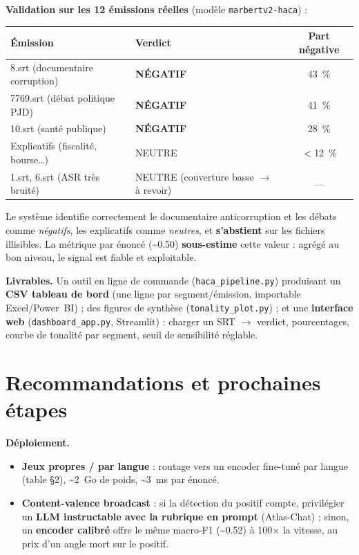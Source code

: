 \documentclass[11pt, a4paper]{article}
\begin{document}
\textbf{Validation sur les 12 émissions réelles} (modèle \texttt{marbertv2-haca}) :

\begin{center}
\small
\begin{tabular}{llc}
\toprule
\textbf{Émission} & \textbf{Verdict} & \textbf{Part négative} \\
\midrule
8.srt (documentaire corruption)  & \textcolor{warnred}{\textbf{NÉGATIF}} & 43~\% \\
7769.srt (débat politique PJD)    & \textcolor{warnred}{\textbf{NÉGATIF}} & 41~\% \\
10.srt (santé publique)           & \textcolor{warnred}{\textbf{NÉGATIF}} & 28~\% \\
Explicatifs (fiscalité, bourse…)  & NEUTRE & $<$12~\% \\
1.srt, 6.srt (ASR très bruité)    & NEUTRE (couverture basse $\rightarrow$ à revoir) & --- \\
\bottomrule
\end{tabular}
\end{center}

Le système identifie correctement le documentaire anticorruption et les débats comme
\emph{négatifs}, les explicatifs comme \emph{neutres}, et \textbf{s'abstient} sur les
fichiers illisibles. La métrique par énoncé (\textasciitilde0.50) \textbf{sous-estime} cette
valeur : agrégé au bon niveau, le signal est fiable et exploitable.

\textbf{Livrables.} Un outil en ligne de commande (\texttt{haca\_pipeline.py}) produisant un
\textbf{CSV tableau de bord} (une ligne par segment/émission, importable Excel/Power~BI) ;
des figures de synthèse (\texttt{tonality\_plot.py}) ; et une \textbf{interface web}
(\texttt{dashboard\_app.py}, Streamlit) : charger un SRT $\rightarrow$ verdict, pourcentages,
courbe de tonalité par segment, seuil de sensibilité réglable.

\section{Recommandations et prochaines étapes}

\textbf{Déploiement.}
\begin{itemize}[leftmargin=1.2em, itemsep=2pt]
  \item \textbf{Jeux propres / par langue} : routage vers un encoder fine-tuné par
  langue (table §2), \textasciitilde2~Go de poids, \textasciitilde3~ms par énoncé.
  \item \textbf{Content-valence broadcast} : si la détection du positif compte,
  privilégier un \textbf{LLM instructable avec la rubrique en prompt}
  (Atlas-Chat) ; sinon, un \textbf{encoder calibré} offre le même macro-F1
  (\textasciitilde0.52) à 100$\times$ la vitesse, au prix d'un angle mort sur le positif.
\end{itemize}
\end{document}
